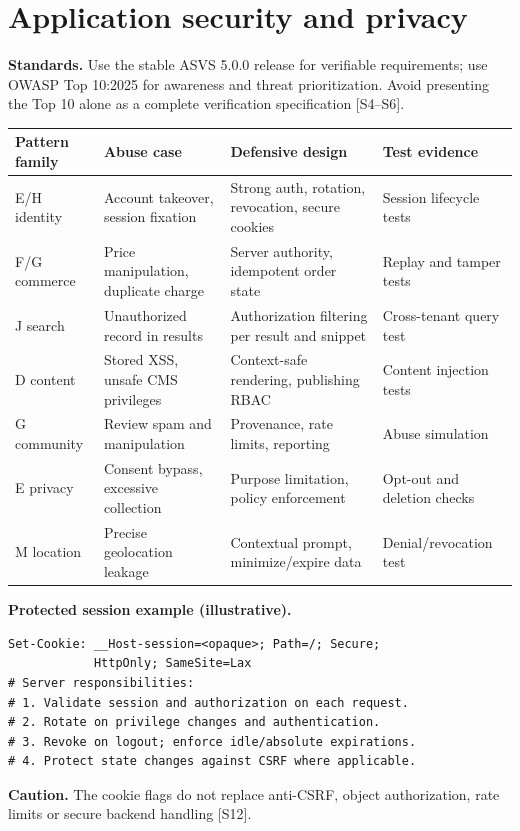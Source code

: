 \documentclass[11pt]{article}
\begin{document}
\section{Application security and privacy}

\textbf{Standards.} Use the stable ASVS 5.0.0 release for verifiable requirements; use OWASP Top 10:2025 for awareness and threat prioritization. Avoid presenting the Top 10 alone as a complete verification specification [S4--S6].
\begin{longtable}{@{}>{\raggedright\arraybackslash}p{23mm}>{\raggedright\arraybackslash}p{40mm}>{\raggedright\arraybackslash}p{47mm}>{\raggedright\arraybackslash}p{34mm}@{}}\toprule
Pattern family & Abuse case & Defensive design & Test evidence\\\midrule\endhead
E/H identity & Account takeover, session fixation & Strong auth, rotation, revocation, secure cookies & Session lifecycle tests\\
F/G commerce & Price manipulation, duplicate charge & Server authority, idempotent order state & Replay and tamper tests\\
J search & Unauthorized record in results & Authorization filtering per result and snippet & Cross-tenant query test\\
D content & Stored XSS, unsafe CMS privileges & Context-safe rendering, publishing RBAC & Content injection tests\\
G community & Review spam and manipulation & Provenance, rate limits, reporting & Abuse simulation\\
E privacy & Consent bypass, excessive collection & Purpose limitation, policy enforcement & Opt-out and deletion checks\\
M location & Precise geolocation leakage & Contextual prompt, minimize/expire data & Denial/revocation test\\
\bottomrule\end{longtable}
\textbf{Protected session example (illustrative).}
\begin{lstlisting}[language={}]
Set-Cookie: __Host-session=<opaque>; Path=/; Secure;
            HttpOnly; SameSite=Lax
# Server responsibilities:
# 1. Validate session and authorization on each request.
# 2. Rotate on privilege changes and authentication.
# 3. Revoke on logout; enforce idle/absolute expirations.
# 4. Protect state changes against CSRF where applicable.
\end{lstlisting}
\textbf{Caution.} The cookie flags do not replace anti-CSRF, object authorization, rate limits or secure backend handling [S12].
\end{document}
